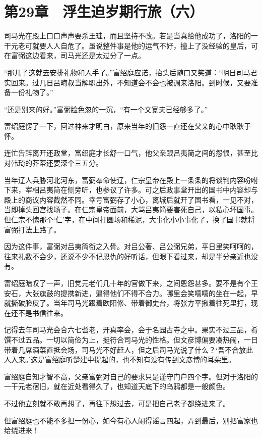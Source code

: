 \section{第29章　浮生迫岁期行旅（六）}

司马光在殿上口口声声要杀王珪，而且坚持不改。若是当真给他成功了，洛阳的一干元老可就要人人自危了。虽说整件事是他的运气不好，撞上了没经验的皇后，可在富弼这边看来，司马光还是太过分了一点。

“那儿子这就去安排礼物和人手了。”富绍庭应诺，抬头后随口又笑道：“明日司马君实回来。过几日吕晦叔当解职出外，不知道会不会也被调来洛阳。到时候，又要准备一份礼物了。”

“还是别来的好。”富弼脸色忽的一沉，“有一个文宽夫已经够多了。”

富绍庭愣了一下，回过神来才明白，原来当年的旧怨一直还在父亲的心中耿耿于怀。

连忙告辞离开还政堂，富绍庭才长舒一口气，他父亲跟吕夷简之间的怨恨，甚至比对韩琦的芥蒂还要深个三五分。

当年辽人兵胁河北河东，富弼奉命使辽，仁宗皇帝在殿上一条条的将谈判内容吩咐下来，宰相吕夷简在侧旁听，也参议了许多。可之后政事堂开出的国书中内容却与殿上的商议内容截然不同。幸亏富弼存了小心，离城后就开了国书看，一见不对，当即掉头回宫找场子。在仁宗皇帝面前，大骂吕夷简要害死自己，以私心坏国事。但仁宗不愧那个‘仁’字，在中间打圆场和稀泥，大事化小小事化了，换了国书就将富弼打法上路了。

因为这件事，富弼对吕夷简衔之入骨。对吕公著、吕公弼兄弟，平日里笑呵呵的，往来礼数不会少，还说不少不记恩仇的好听话，但眼下看过来，却是半分亲近也没有。

富绍庭暗叹了一声，旧党元老们几十年的官做下来，之间恩怨甚多。要不是有个王安石，大张旗鼓的提携新进，逼得他们不得不合力。哪里会笑嘻嘻的坐在一起，早就撕破脸皮了。当年司马光跟着欧阳修、带着御史台，将张方平揪着往死里打，现在还不是书信往来。

记得去年司马光会合六七耆老，开真率会，会于名园古寺之中。果实不过三品，肴馔不过五品。一切以简俭为上，挺符合司马光的性格。但文彦博偏要凑热闹，一日带着几席酒菜直抵会场，司马光不好赶人，但之后司马光说了什么？‘吾不合放此人入来。’这是富绍庭听楚建中提起的，也不知有没有传到文彦博的耳朵里。

富绍庭自知才智不高，父亲富弼对自己的要求只是谨守门户四个字。但对于洛阳的一干元老宿旧，就在近处看得久了，也知道天底下的乌鸦都是一般颜色。

不过他立刻就不敢再想了，再往下想过去，可是把自己老子都绕进来了。

但富绍庭也不能不多担一份心，如今有心人闹得谣言四起，弄到最后，别把富家也给绕进来！


